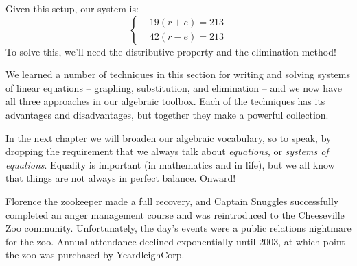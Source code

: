 %
%
%
Given this setup, our system is:
\[
\left\{%
\begin{aligned}
&19(r+e) = 213\\
&42(r-e) = 213
\end{aligned}
\right.
\]
To solve this, we'll need the distributive property and the elimination method!


\chaptersummary

We learned a number of techniques in this section for writing and solving systems of linear equations -- graphing, substitution, and elimination -- and we now have all three approaches in our algebraic toolbox. Each of the techniques has its advantages and disadvantages, but together they make a powerful collection.

In the next chapter we will broaden our algebraic vocabulary, so to speak, by dropping the requirement that we always talk about \textit{equations}, or \textit{systems of equations}. Equality is important (in mathematics and in life), but we all know that things are not always in perfect balance. Onward!

\bigskip
\begin{boxcheese}
Florence the zookeeper made a full recovery, and Captain Snuggles successfully completed an anger management course and was reintroduced to the Cheeseville Zoo community. Unfortunately, the day's events were a public relations nightmare for the zoo. Annual attendance declined exponentially until 2003, at which point the zoo was purchased by YeardleighCorp.
\end{boxcheese}

\chaptercopyright
